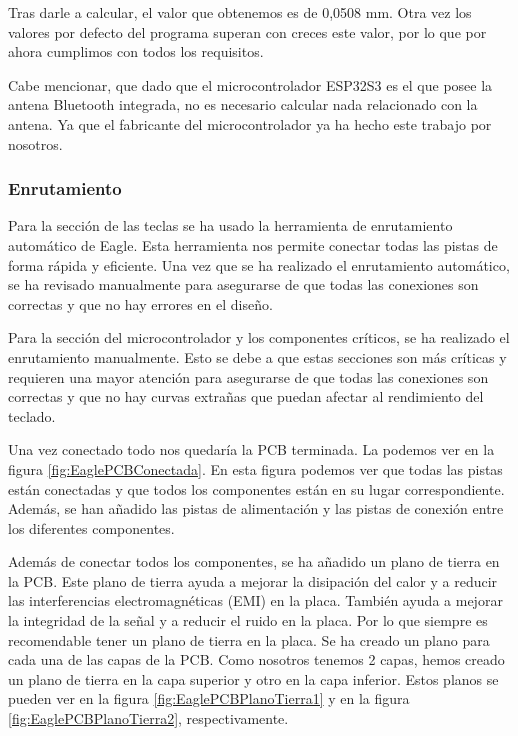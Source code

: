 Tras darle a calcular, el valor que obtenemos es de 0,0508 mm. Otra vez los valores por defecto del programa superan con creces este valor, por lo que por ahora cumplimos con todos los requisitos.

Cabe mencionar, que dado que el microcontrolador ESP32S3 es el que posee la antena \gls{Bluetooth} integrada, no es necesario calcular nada relacionado con la antena. Ya que el fabricante del microcontrolador ya ha hecho este trabajo por nosotros.

\subsubsection{Enrutamiento}
Para la sección de las teclas se ha usado la herramienta de enrutamiento automático de Eagle. Esta herramienta nos permite conectar todas las pistas de forma rápida y eficiente. Una vez que se ha realizado el enrutamiento automático, se ha revisado manualmente para asegurarse de que todas las conexiones son correctas y que no hay errores en el diseño.

Para la sección del microcontrolador y los componentes críticos, se ha realizado el enrutamiento manualmente. Esto se debe a que estas secciones son más críticas y requieren una mayor atención para asegurarse de que todas las conexiones son correctas y que no hay curvas extrañas que puedan afectar al rendimiento del teclado.

Una vez conectado todo nos quedaría la \gls{PCB} terminada. La podemos ver en la figura \ref{fig:EaglePCBConectada}. En esta figura podemos ver que todas las pistas están conectadas y que todos los componentes están en su lugar correspondiente. Además, se han añadido las pistas de alimentación y las pistas de conexión entre los diferentes componentes.

Además de conectar todos los componentes, se ha añadido un plano de tierra en la \gls{PCB}. Este plano de tierra ayuda a mejorar la disipación del calor y a reducir las interferencias electromagnéticas (EMI) en la placa. También ayuda a mejorar la integridad de la señal y a reducir el ruido en la placa. Por lo que siempre es recomendable tener un plano de tierra en la placa. Se ha creado un plano para cada una de las capas de la \gls{PCB}. Como nosotros tenemos 2 capas, hemos creado un plano de tierra en la capa superior y otro en la capa inferior.
Estos planos se pueden ver en la figura \ref{fig:EaglePCBPlanoTierra1} y en la figura \ref{fig:EaglePCBPlanoTierra2}, respectivamente.


